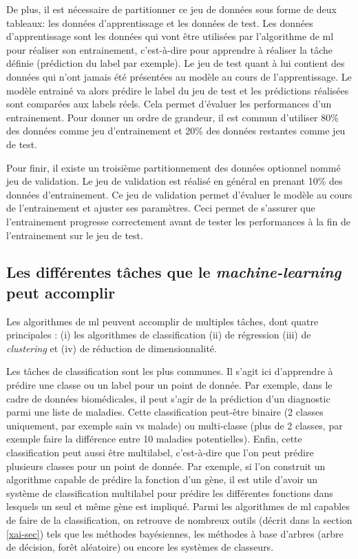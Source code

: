 De plus, il est nécessaire de partitionner ce jeu de données sous forme de deux tableaux: les données d'apprentissage et les données de test. Les données d'apprentissage sont les données qui vont être utilisées par l'algorithme de \gls{ml} pour réaliser son entrainement, c'est-à-dire pour apprendre à réaliser la tâche définie (prédiction du label par exemple). Le jeu de test quant à lui contient des données qui n'ont jamais été présentées au modèle au cours de l'apprentissage. Le modèle entrainé va alors prédire le label du jeu de test et les prédictions réalisées sont comparées aux labels réels. Cela permet d'évaluer les performances d'un entrainement. Pour donner un ordre de grandeur, il est commun d'utiliser 80\% des données comme jeu d'entrainement et 20\% des données restantes comme jeu de test.

Pour finir, il existe un troisième partitionnement des données optionnel nommé jeu de validation. Le jeu de validation est réalisé en général en prenant 10\% des données d'entrainement. Ce jeu de validation permet d'évaluer le modèle au cours de l'entrainement et ajuster ses paramètres. Ceci permet de s'assurer que l'entrainement progresse correctement avant de tester les performances à la fin de l'entrainement sur le jeu de test.

\subsection{Les différentes tâches que le \textit{machine-learning} peut accomplir}
Les algorithmes de \gls{ml} peuvent accomplir de multiples tâches, dont quatre principales : (i) les algorithmes de classification (ii) de régression (iii) de \textit{clustering} et (iv) de réduction de dimensionnalité.

Les tâches de classification sont les plus communes. Il s'agit ici d'apprendre à prédire une classe ou un label pour un point de donnée. Par exemple, dans le cadre de données biomédicales, il peut s'agir de la prédiction d'un diagnostic parmi une liste de maladies. Cette classification peut-être binaire (2 classes uniquement, par exemple sain vs malade) ou multi-classe (plus de 2 classes, par exemple faire la différence entre 10 maladies potentielles). Enfin, cette classification peut aussi être multilabel, c'est-à-dire que l'on peut prédire plusieurs classes pour un point de donnée. Par exemple, si l’on construit un algorithme capable de prédire la fonction d'un gène, il est utile d'avoir un système de classification multilabel pour prédire les différentes fonctions dans lesquels un seul et même gène est impliqué. Parmi les algorithmes de \gls{ml} capables de faire de la classification, on retrouve de nombreux outils (décrit dans la section \ref{xai-sec}) tels que les méthodes bayésiennes, les méthodes à base d'arbres (arbre de décision, forêt aléatoire) ou encore les systèmes de classeurs.

